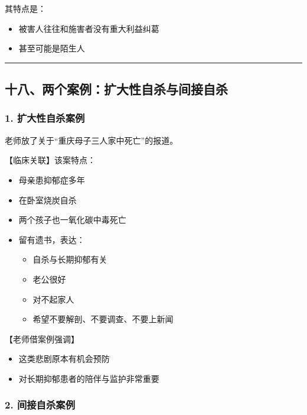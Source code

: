 \documentclass[
  chinese,
  9pt,
  a4paper,
]{ctexart}
\providecommand{\tightlist}{%
  \setlength{\itemsep}{0pt}\setlength{\parskip}{0pt}}
\begin{document}
其特点是：

\begin{itemize}
\tightlist
\item
  被害人往往和施害者没有重大利益纠葛
\item
  甚至可能是陌生人
\end{itemize}

\begin{center}\rule{0.5\linewidth}{0.5pt}\end{center}

\subsection{十八、两个案例：扩大性自杀与间接自杀}\label{ux5341ux516bux4e24ux4e2aux6848ux4f8bux6269ux5927ux6027ux81eaux6740ux4e0eux95f4ux63a5ux81eaux6740}

\subsubsection{1.
扩大性自杀案例}\label{ux6269ux5927ux6027ux81eaux6740ux6848ux4f8b}

老师放了关于``重庆母子三人家中死亡''的报道。

【临床关联】该案特点：

\begin{itemize}
\item
  母亲患抑郁症多年
\item
  在卧室烧炭自杀
\item
  两个孩子也一氧化碳中毒死亡
\item
  留有遗书，表达：

  \begin{itemize}
  \tightlist
  \item
    自杀与长期抑郁有关
  \item
    老公很好
  \item
    对不起家人
  \item
    希望不要解剖、不要调查、不要上新闻
  \end{itemize}
\end{itemize}

【老师借案例强调】

\begin{itemize}
\tightlist
\item
  这类悲剧原本有机会预防
\item
  对长期抑郁患者的陪伴与监护非常重要
\end{itemize}

\subsubsection{2.
间接自杀案例}\label{ux95f4ux63a5ux81eaux6740ux6848ux4f8b}
\end{document}
